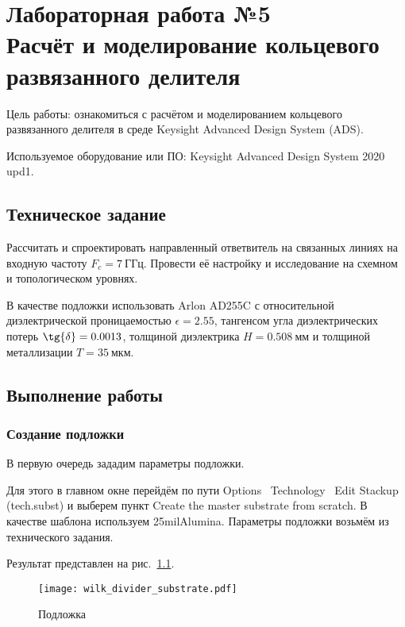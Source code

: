 \chapter{Лабораторная работа №5 \\
Расчёт и моделирование кольцевого развязанного делителя}

Цель работы: ознакомиться с расчётом и моделированием кольцевого развязанного делителя в среде Keysight Advanced Design System (ADS).

Используемое оборудование или ПО: Keysight Advanced Design System 2020 upd1.

\section{Техническое задание}

Рассчитать и спроектировать направленный ответвитель на связанных линиях на входную частоту $F_c = 7~\text{ГГц}$.
Провести её настройку и исследование на схемном и топологическом уровнях.

В качестве подложки использовать Arlon AD255C с относительной диэлектрической проницаемостью $\epsilon = 2.55$, тангенсом угла диэлектрических потерь $\tg{\delta} = 0.0013$, толщиной диэлектрика $H = 0.508~\text{мм}$ и толщиной металлизации $T = 35~\text{мкм}$.

\section{Выполнение работы}

\subsection{Создание подложки}

В первую очередь зададим параметры подложки.

Для этого в главном окне перейдём по пути Options \textrightarrow\ Technology \textrightarrow\ Edit Stackup (tech.subst) и выберем пункт Create the master substrate from scratch.
В качестве шаблона используем 25milAlumina.
Параметры подложки возьмём из технического задания.

Результат представлен на рис.~\ref{fig:wilk_divider_substrate}.

\begin{figure}
    \centering
    \texttt{[image: wilk\_divider\_substrate.pdf]}
    \caption{Подложка}%
    \label{fig:wilk_divider_substrate}
\end{figure}

